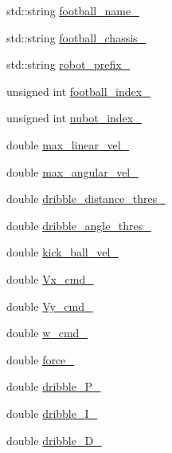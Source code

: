 \begin{DoxyCompactItemize}
\item 
std\-::string \hyperlink{classgazebo_1_1NubotGazebo_aea004ec0ee1c5dfdc8cba31939f18e39}{football\-\_\-name\-\_\-}
\item 
std\-::string \hyperlink{classgazebo_1_1NubotGazebo_a918fab93f4939a8bb06d65a997e20a54}{football\-\_\-chassis\-\_\-}
\item 
std\-::string \hyperlink{classgazebo_1_1NubotGazebo_a5d3cf2ace05ce1ade8b71d1c6397a7b0}{robot\-\_\-prefix\-\_\-}
\item 
unsigned int \hyperlink{classgazebo_1_1NubotGazebo_af45b036c2156b537d5282f63c509d1e4}{football\-\_\-index\-\_\-}
\item 
unsigned int \hyperlink{classgazebo_1_1NubotGazebo_adce69b7247cba8a3433a6cdfad5b61ef}{nubot\-\_\-index\-\_\-}
\item 
double \hyperlink{classgazebo_1_1NubotGazebo_a67f7850c63c5dd6fe80694c9a426e5ec}{max\-\_\-linear\-\_\-vel\-\_\-}
\item 
double \hyperlink{classgazebo_1_1NubotGazebo_ae9da5f6a1c7b5624dbf6bb20a2819d40}{max\-\_\-angular\-\_\-vel\-\_\-}
\item 
double \hyperlink{classgazebo_1_1NubotGazebo_a646a80199e35f2f47558b7b7aa27bea4}{dribble\-\_\-distance\-\_\-thres\-\_\-}
\item 
double \hyperlink{classgazebo_1_1NubotGazebo_ab012e0229172416640558cf2746a0974}{dribble\-\_\-angle\-\_\-thres\-\_\-}
\item 
double \hyperlink{classgazebo_1_1NubotGazebo_abc8f7cb67014e700c08e27023353e419}{kick\-\_\-ball\-\_\-vel\-\_\-}
\item 
double \hyperlink{classgazebo_1_1NubotGazebo_af17747304ff9b241fa0642c52923498b}{Vx\-\_\-cmd\-\_\-}
\item 
double \hyperlink{classgazebo_1_1NubotGazebo_a977c91e62fed23c5fb9233e5d38ad597}{Vy\-\_\-cmd\-\_\-}
\item 
double \hyperlink{classgazebo_1_1NubotGazebo_aebc0851c9ab6da1d1c96d470e72758f8}{w\-\_\-cmd\-\_\-}
\item 
double \hyperlink{classgazebo_1_1NubotGazebo_a7ebd21f6da11a8f2b514c2e0930a26e6}{force\-\_\-}
\item 
double \hyperlink{classgazebo_1_1NubotGazebo_a9e30363181d0a790081ce6d0e9151e6b}{dribble\-\_\-\-P\-\_\-}
\item 
double \hyperlink{classgazebo_1_1NubotGazebo_ab74f3e63fe906f0c982837b1eeeefb5c}{dribble\-\_\-\-I\-\_\-}
\item 
double \hyperlink{classgazebo_1_1NubotGazebo_a727079312e073df8799e1a385ac8da00}{dribble\-\_\-\-D\-\_\-}

\end{DoxyCompactItemize}
